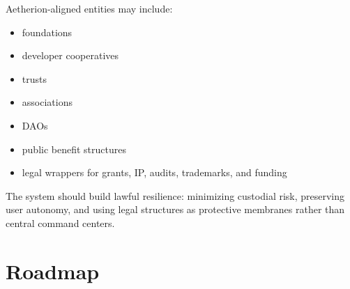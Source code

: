 ﻿\documentclass[12pt]{article}
\begin{document}
Aetherion-aligned entities may include:

\begin{itemize}
  \item foundations
  \item developer cooperatives
  \item trusts
  \item associations
  \item DAOs
  \item public benefit structures
  \item legal wrappers for grants, IP, audits, trademarks, and funding
\end{itemize}

The system should build lawful resilience: minimizing custodial risk, preserving user autonomy, and using legal structures as protective membranes rather than central command centers.

\section{Roadmap}
\end{document}
